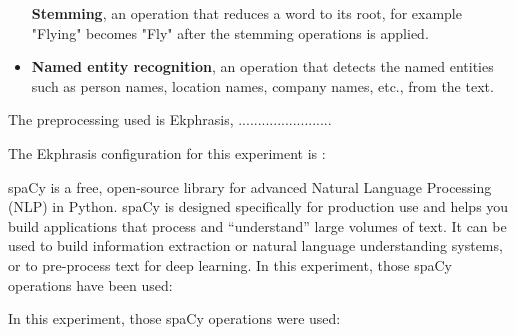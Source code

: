 \documentclass[12pt, a4paper]{article}
\begin{document}
\begin{itemize}
        \begin{minipage}[t]{\linewidth}
        \textbf{Stemming}, an operation that reduces a word to its root, for example "Flying" becomes "Fly" after the stemming operations is applied.
         \end{minipage}  
    \item
        \begin{minipage}[t]{\linewidth}
        \textbf{Named entity recognition}, an operation that detects the named entities such as person names, location names, company names, etc., from the text.
         \end{minipage}  
\end{itemize}

\hfill\break



The preprocessing used is Ekphrasis, ........................

\hfill\break
The Ekphrasis configuration for this experiment is :




spaCy is a free, open-source library for advanced Natural Language Processing (NLP) in Python.
spaCy is designed specifically for production use and helps you build applications that process and “understand”
large volumes of text.
It can be used to build information extraction or natural language understanding systems,
or to pre-process text for deep learning.
In this experiment, those spaCy operations have been used:

\hfill\break
In this experiment, those spaCy operations were used:
\end{document}
